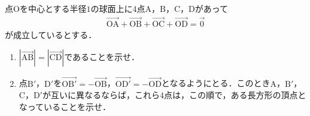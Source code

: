 点$\mathrm{O}$を中心とする半径$1$の球面上に$4$点$\mathrm{A}$，$\mathrm{B}$，$\mathrm{C}$，$\mathrm{D}$があって
\begin{align*}
  \overrightarrow{\mathrm{OA}}+ \overrightarrow{\mathrm{OB}}+ \overrightarrow{\mathrm{OC}}+ \overrightarrow{\mathrm{OD}}=\overrightarrow{0}
\end{align*}
が成立しているとする．
\begin{enumerate}
  \item $|\overrightarrow{\mathrm{AB}}|=|\overrightarrow{\mathrm{CD}}|$であることを示せ．
  \item 点$\mathrm{B'}$，$\mathrm{D'}$を$\overrightarrow{\mathrm{OB'}}=-\overrightarrow{\mathrm{OB}}$，$\overrightarrow{\mathrm{OD'}}=-\overrightarrow{\mathrm{OD}}$となるようにとる．このとき$\mathrm{A}$，$\mathrm{B}'$，$\mathrm{C}$，$\mathrm{D}'$が互いに異なるならば，これら$4$点は，この順で，ある長方形の頂点となっていることを示せ．
\end{enumerate}